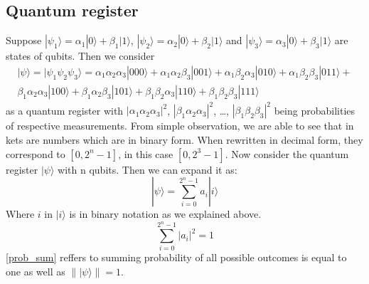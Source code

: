 \subsection{Quantum register}

Suppose $|\psi_1\rangle = \alpha_1 |0\rangle +\beta_1 |1\rangle$, $ |\psi_2\rangle = \alpha_2 |0\rangle +\beta_2 |1\rangle$ and $|\psi_3\rangle = \alpha_3 |0\rangle +\beta_3 |1\rangle $ are states of qubits. Then we consider 
\begin{equation} \label{3qubitsystem}
  \begin{aligned}
    |\psi\rangle = |\psi_1 \psi_2 \psi_3\rangle = 
    \alpha_1 \alpha_2 \alpha_3 |000\rangle +
    \alpha_1 \alpha_2 \beta_3 |001\rangle +
    \alpha_1 \beta_2 \alpha_3 |010\rangle +
    \alpha_1 \beta_2 \beta_3 |011\rangle + \\
    \beta_1 \alpha_2 \alpha_3 |100\rangle +
    \beta_1 \alpha_2 \beta_3 |101\rangle +
    \beta_1 \beta_2 \alpha_3 |110\rangle +
    \beta_1 \beta_2 \beta_3 |111\rangle  
    \end{aligned}
\end{equation}
as a quantum register with $ |\alpha_1 \alpha_2 \alpha_3|^2$, $ |\beta_1 \alpha_2 \alpha_3|^2$, \dots , $|\beta_1 \beta_2 \beta_3 |^2$ being probabilities of respective measurements. From simple observation, we are able to see that in kets are numbers which are in binary form. When rewritten in decimal form, they correspond to $[0,2^{n}-1]$, in this case $[0,2^{3}-1]$. Now consider the quantum register $|\psi\rangle$ with n qubits. Then we can expand it as:
\begin{equation}
    |\psi\rangle =  \sum_{i=0}^{2^n-1} a_i |i\rangle 
\end{equation}
Where $i$ in $|i\rangle $ is in binary notation as we explained above.
\begin{equation} \label{prob_sum}
    \sum_{i=0}^{2^n-1} |a_i|^2 = 1 
\end{equation}
\ref{prob_sum} reffers to summing probability of all possible outcomes is equal to one as well as $\lVert | \psi \rangle \rVert = 1$. 

